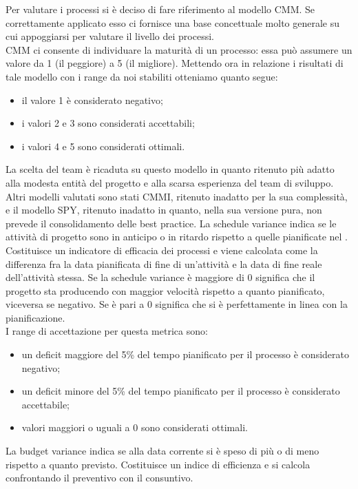					Per valutare i processi si è deciso di fare riferimento al modello CMM. Se correttamente applicato esso ci fornisce una base 
					concettuale molto generale su cui appoggiarsi per valutare il livello dei processi.\\
					CMM ci consente di individuare la maturità di un processo: essa può assumere un valore da 1 (il peggiore) a 5 (il migliore). Mettendo ora in relazione i risultati di tale modello con i range da noi stabiliti otteniamo quanto segue:
					\begin{itemize}
						\item il valore 1 è considerato negativo;
						\item i valori 2 e 3 sono considerati accettabili;
						\item i valori 4 e 5 sono considerati ottimali.
					\end{itemize}
					La scelta del team è ricaduta su questo modello in quanto ritenuto più adatto alla modesta entità del progetto e alla scarsa esperienza del team di sviluppo. Altri modelli valutati sono stati CMMI, ritenuto inadatto per la sua complessità, e il modello SPY, ritenuto inadatto in quanto, nella sua versione pura, non prevede il consolidamento delle best practice.
La schedule variance indica se le attività di progetto sono in anticipo o in ritardo rispetto a quelle pianificate nel . Costituisce un indicatore di efficacia dei processi e viene calcolata come la differenza fra la data pianificata di fine di un'attività e la data di fine reale dell'attività stessa. Se la schedule variance è maggiore di 0 significa che il progetto sta producendo con maggior velocità rispetto a quanto pianificato, viceversa se negativo. Se è pari a 0 significa che si è perfettamente in linea con la pianificazione.\\
I range di accettazione per questa metrica sono:
\begin{itemize}
\item un deficit maggiore del 5\% del tempo pianificato per il processo è considerato negativo;
\item un deficit minore del 5\% del tempo pianificato per il processo è considerato accettabile;
\item valori maggiori o uguali a 0 sono considerati ottimali.
\end{itemize}
La budget variance indica se alla data corrente si è speso di più o di meno rispetto a quanto previsto. Costituisce un indice di efficienza e si calcola confrontando il preventivo con il consuntivo.\\
